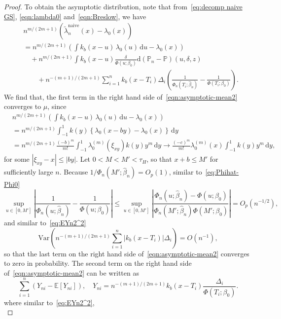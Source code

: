 \documentclass[11pt,reqno]{amsart}
\theoremstyle{definition}
\theoremstyle{plain}
\theoremstyle{remark}
\begin{document}
\begin{proof}
To obtain the asymptotic distribution, note that from~\eqref{eq:decomp naive GS}, \eqref{eqn:lambda0} and~\eqref{eqn:Breslow}, we have
\begin{equation}
\label{eqn:asymptotic-mean2}
\begin{split}
&n^{m/(2m+1)}
\left(
\tilde{\lambda}_n^{\mathrm{naive}}(x)-\lambda_0(x)
\right)\\
&=
n^{m/(2m+1)}
\left(
\int k_b(x-u)\,\lambda_0(u)\,\mathrm{d}u-\lambda_0(x)
\right)\\
&\quad+
n^{m/(2m+1)}
\int k_b(x-u)\frac{\delta}{\Phi(u;\beta_0)}\mathrm{d}({\mathbb{P}}_n-{\mathbb{P}})(u,\delta,z)\\
&\qquad+
n^{-(m+1)/(2m+1)}
\sum_{i=1}^n k_b(x-T_i)\Delta_i
\left(
\frac{1}{\Phi_n(T_i;\hat{\beta}_n)}-\frac{1}{\Phi(T_i;\beta_0)}
\right).
\end{split}
\end{equation}
We find that,
the first term in the right hand side of~\eqref{eqn:asymptotic-mean2} converges to $\mu$,
since
\[
\begin{split}
&
n^{m/(2m+1)}
\left(
\int k_b(x-u)\,\lambda_0(u)\,\mathrm{d}u-\lambda_0(x)
\right)\\
&=
n^{m/(2m+1)}
\int_{-1}^1 k(y)
\left\{
\lambda_0(x-by)-\lambda_0(x)
\right\}\,\mathrm{d}y\\
&=
n^{m/(2m+1)}
\frac{(-b)^m}{m!}
\int_{-1}^1
\lambda_0^{(m)}(\xi_{xy})k(y)y^m\,\mathrm{d}y
\to
\frac{(-c)^m}{m!}
\lambda_0^{(m)}(x)
\int_{-1}^1 k(y)y^m\,\mathrm{d}y,
\end{split}
\]
for some $|\xi_{xy}-x|\leq |by|$.
Let $0<M<M'<\tau_H$, so that $x+b\leq M'$ for sufficiently large $n$.
Because $1/\Phi_n(M';\hat{\beta}_n)=O_p(1)$, similar to~\eqref{eq:Phihat-Phi0}
\[
\sup_{u\in[0,M']}
\left|
\frac{1}{\Phi_n(u;\hat{\beta}_n)}-\frac{1}{\Phi(u;\beta_0)}
\right|
\leq
\sup_{u\in[0,M']}
\left|
\frac{\Phi_n(u;\hat{\beta}_n)-\Phi(u;\beta_0)}{\Phi_n(M';\hat{\beta}_n)\Phi(M';\beta_0)}
\right|
=
O_p(n^{-1/2}),
\]
and similar to~\eqref{eq:EYn2^2}
\[
\text{Var}
\left(
n^{-(m+1)/(2m+1)}
\sum_{i=1}^n
\left|
k_b(x-T_i)
\right|\Delta_i\right)
=
O(n^{-1}),
\]
so that the last term on the right hand side of~\eqref{eqn:asymptotic-mean2} converges to zero in probability.
The second term on the right hand side of~\eqref{eqn:asymptotic-mean2} can be written as
\[
\sum_{i=1}^n
\left(
Y_{ni}-{\mathbb{E}}\left[Y_{ni}\right]
\right),
\quad
Y_{ni}
=
n^{-(m+1)/(2m+1)}
k_b(x-T_i)\frac{\Delta_i}{\Phi(T_i;\beta_0)}.
\]
where similar to~\eqref{eq:EYn2^2},
\begin{equation}
\label{eq:EYn2^2 GS}

\end{equation}
\end{proof}
\end{document}
